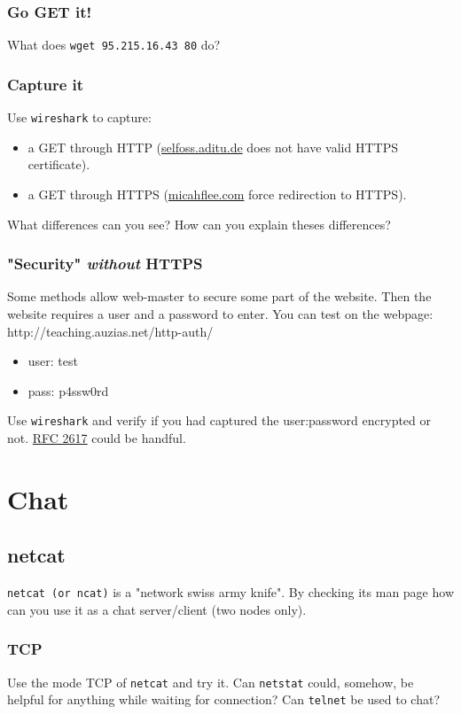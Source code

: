 \documentclass[11pt]{article}
\begin{document}
\subsubsection{Go GET it!}
What does \verb"wget 95.215.16.43 80" do?

\subsubsection{Capture it}
Use \verb"wireshark" to capture:
\begin{itemize}
  \item a GET through HTTP (\color{blue}\href{http://selfoss.aditu.de/}{selfoss.aditu.de}\color{black} does not have valid HTTPS certificate).
  \item a GET through HTTPS (\color{blue}\href{https://micahflee.com/}{micahflee.com}\color{black} force redirection to HTTPS).
\end{itemize}
What differences can you see? How can you explain theses differences?

\subsubsection{"Security" \emph{without} HTTPS}
Some methods allow web-master to secure some part of the website. Then the website requires a user and a password to enter. You can test on the webpage: http://teaching.auzias.net/http-auth/
\begin{itemize}
  \item user: test
  \item pass: p4ssw0rd
\end{itemize}
Use \verb"wireshark" and verify if you had captured the user:password encrypted or not. \color{blue}\href{http://tools.ietf.org/html/rfc2617}{RFC 2617}\color{black} could be handful.

\section{Chat}
\subsection{netcat}
\verb"netcat (or ncat)" is a "network swiss army knife". By checking its man page how can you use it as a chat server/client (two nodes only).
\subsubsection{TCP}
Use the mode TCP of \verb"netcat" and try it. Can \verb"netstat" could, somehow, be helpful for anything while waiting for connection? Can \verb"telnet" be used to chat?
\end{document}

